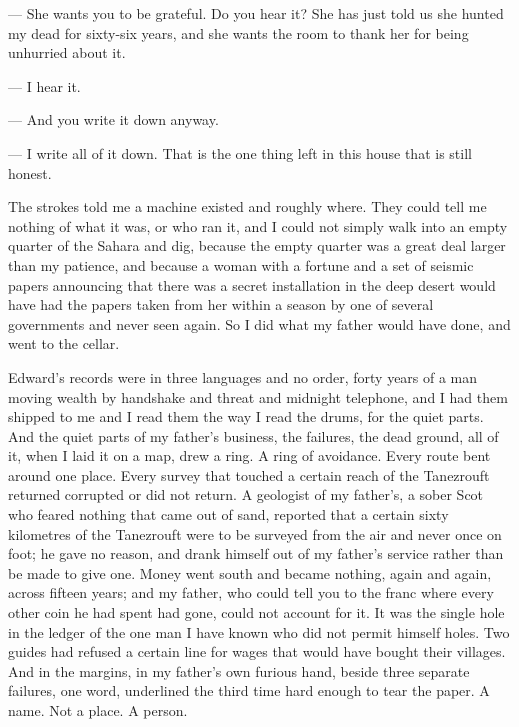 \begin{room}

--- She wants you to be grateful. Do you hear it? She has just told us she hunted my dead for sixty-six years, and she wants the room to thank her for being unhurried about it.

--- I hear it.

--- And you write it down anyway.

--- I write all of it down. That is the one thing left in this house that is still honest.

\end{room}

The strokes told me a machine existed and roughly where. They could tell me nothing of what it was, or who ran it, and I could not simply walk into an empty quarter of the Sahara and dig, because the empty quarter was a great deal larger than my patience, and because a woman with a fortune and a set of seismic papers announcing that there was a secret installation in the deep desert would have had the papers taken from her within a season by one of several governments and never seen again. So I did what my father would have done, and went to the cellar.\par

Edward's records were in three languages and no order, forty years of a man moving wealth by handshake and threat and midnight telephone, and I had them shipped to me and I read them the way I read the drums, for the quiet parts. And the quiet parts of my father's business, the failures, the dead ground, all of it, when I laid it on a map, drew a ring. A ring of avoidance. Every route bent around one place. Every survey that touched a certain reach of the Tanezrouft returned corrupted or did not return. A geologist of my father's, a sober Scot who feared nothing that came out of sand, reported that a certain sixty kilometres of the Tanezrouft were to be surveyed from the air and never once on foot; he gave no reason, and drank himself out of my father's service rather than be made to give one. Money went south and became nothing, again and again, across fifteen years; and my father, who could tell you to the franc where every other coin he had spent had gone, could not account for it. It was the single hole in the ledger of the one man I have known who did not permit himself holes. Two guides had refused a certain line for wages that would have bought their villages. And in the margins, in my father's own furious hand, beside three separate failures, one word, underlined the third time hard enough to tear the paper. A name. Not a place. A person.\par

